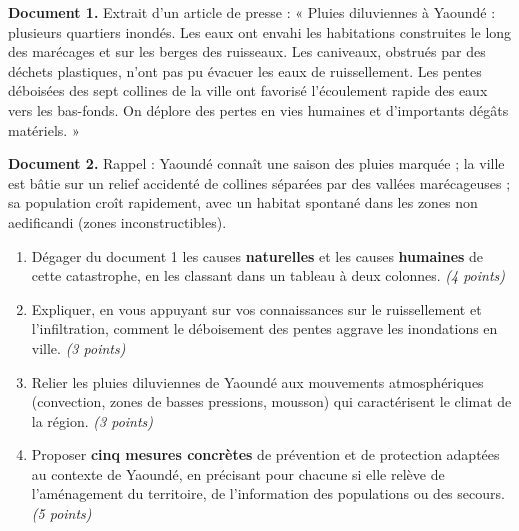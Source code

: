 \documentclass[11pt]{article}
\begin{document}
\begin{exercice}
\textbf{Document 1.} Extrait d'un article de presse : « Pluies diluviennes à Yaoundé : plusieurs quartiers inondés. Les eaux ont envahi les habitations construites le long des marécages et sur les berges des ruisseaux. Les caniveaux, obstrués par des déchets plastiques, n'ont pas pu évacuer les eaux de ruissellement. Les pentes déboisées des sept collines de la ville ont favorisé l'écoulement rapide des eaux vers les bas-fonds. On déplore des pertes en vies humaines et d'importants dégâts matériels. »

\textbf{Document 2.} Rappel : Yaoundé connaît une saison des pluies marquée ; la ville est bâtie sur un relief accidenté de collines séparées par des vallées marécageuses ; sa population croît rapidement, avec un habitat spontané dans les zones non aedificandi (zones inconstructibles).

\begin{enumerate}
\item Dégager du document 1 les causes \textbf{naturelles} et les causes \textbf{humaines} de cette catastrophe, en les classant dans un tableau à deux colonnes. \emph{(4 points)}
\item Expliquer, en vous appuyant sur vos connaissances sur le ruissellement et l'infiltration, comment le déboisement des pentes aggrave les inondations en ville. \emph{(3 points)}
\item Relier les pluies diluviennes de Yaoundé aux mouvements atmosphériques (convection, zones de basses pressions, mousson) qui caractérisent le climat de la région. \emph{(3 points)}
\item Proposer \textbf{cinq mesures concrètes} de prévention et de protection adaptées au contexte de Yaoundé, en précisant pour chacune si elle relève de l'aménagement du territoire, de l'information des populations ou des secours. \emph{(5 points)}
\end{enumerate}
\end{exercice}
\end{document}

